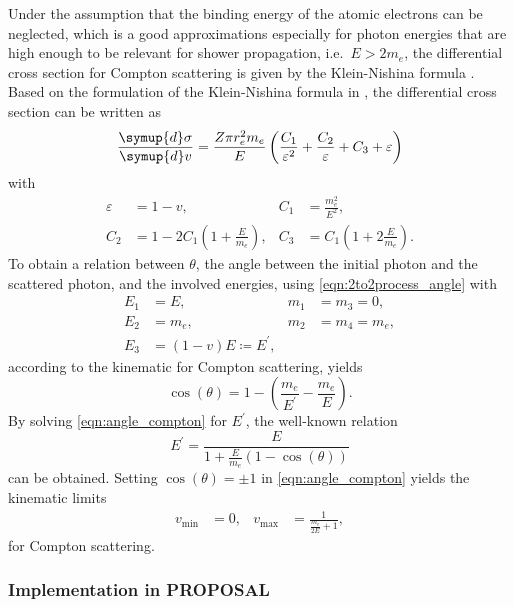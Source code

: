 Under the assumption that the binding energy of the atomic electrons can be neglected, which is a good approximations especially for photon energies that are high enough to be relevant for shower propagation, i.e.\ $E > 2 m_e$, the differential cross section for Compton scattering is given by the Klein-Nishina formula \cite{KleinNishina}.
Based on the formulation of the Klein-Nishina formula in \cite{Hirayama:2005zm}, the differential cross section can be written as
%
\begin{equation}
	\frac{\symup{d}\sigma}{\symup{d}v} = \frac{Z \pi r_e^2 m_e}{E} \left( \frac{C_1}{\varepsilon^2} + \frac{C_2}{\varepsilon} + C_3 + \varepsilon \right)
\end{equation}
%
with
%
\begin{align}
	\varepsilon &= 1 - v, & C_1 &= \frac{m_e^2}{E^2}, \\
	C_2 &= 1 - 2 C_1 \left( 1 + \frac{E}{m_e} \right) , & C_3 &= C_1 \left( 1 + 2 \frac{E}{m_e} \right).
\end{align}
%
To obtain a relation between $\theta$, the angle between the initial photon and the scattered photon, and the involved energies, using \eqref{eqn:2to2process_angle} with
%
\begin{align*}
	E_1 &= E, & m_1 &= m_3 = 0, \\
	E_2 &= m_e, & m_2 &= m_4 = m_e, \\
	E_3 &= (1 - v) E \coloneqq E^{\prime},
\end{align*}
%
according to the kinematic for Compton scattering, yields
%
\begin{equation}
	\label{eqn:angle_compton}
	\cos(\theta) = 1 - \left( \frac{m_e}{E^{\prime}} - \frac{m_e}{E} \right).
\end{equation}
%
By solving \eqref{eqn:angle_compton} for $E^{\prime}$, the well-known relation
%
\begin{equation}
	E^{\prime} = \frac{E}{1 + \frac{E}{m_e} (1 - \cos(\theta))}
\end{equation}
%
can be obtained.
Setting $\cos(\theta) = \pm1$ in \eqref{eqn:angle_compton} yields the kinematic limits
%
\begin{align}
	v_{\text{min}} &= 0, & v_{\text{max}} &= \frac{1}{\frac{m_e}{2E} + 1},
\end{align}
%
for Compton scattering.

\subsubsection{Implementation in PROPOSAL}

